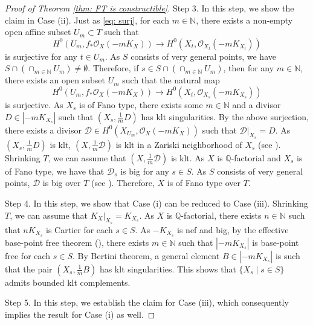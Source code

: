 \documentclass[11pt,oneside,reqno]{amsart}
\numberwithin{equation}{section}
\theoremstyle{definition}
\newcommand{\bN}{\mathbb{N}}
\newcommand{\bQ}{\mathbb{Q}}
\newcommand{\mD}{\mathcal{D}}
\newcommand{\mO}{\mathcal{O}}
\begin{document}
\begin{proof}[Proof of Theorem \ref{thm: FT is constructible}]
Step 3. In this step, we show the claim in Case (ii). Just as \eqref{eq: surj}, for each $m\in \bN$, there exists a non-empty open affine subset $U_m\subset T$ such that
\[
H^0(U_m, f_*\mO_X(-mK_X)) \to H^0(X_t, \mO_{X_t}(-mK_{X_t}))
\] is surjective for any $t\in U_m$. As $S$ consists of very general points, we have $S \cap (\cap_{m\in \bN} U_m) \neq \emptyset$. Therefore, if $s\in S \cap (\cap_{m\in \bN} U_m)$, then for any $m\in \bN$, there exists an open subset $U_m$ such that the natural map
\[
H^0(U_m, f_*\mO_X(-mK_X)) \to H^0(X_t, \mO_{X_s}(-mK_{X_s}))
\] is surjective. As $X_s$ is of Fano type, there exists some $m \in \bN$ and a divisor $D \in |-mK_{X_s}|$ such that $(X_s, \frac{1}{m} D)$ has klt singularities. By the above surjection, there exists a divisor $\mD \in H^0(X_{U_m}, \mO_X(-mK_X))$ such that $\mD|_{X_s}=D$. As $(X_s, \frac{1}{m} D)$ is klt, $(X, \frac 1 m \mD)$ is klt in a Zariski neighborhood of $X_s$ (see \cite[Theorem 9.5.19]{Laz04b}). Shrinking $T$, we can assume that $(X, \frac 1 m \mD)$ is klt. As $X$ is $\bQ$-factorial and $X_s$ is of Fano type, we have that $\mD_s$ is big for any $s\in S$. As $S$ consists of very general points, $\mD$ is big over $T$ (see \cite[Theorem 3.18]{Li22}). Therefore, $X$ is of Fano type over $T$.



Step 4. In this step, we show that Case (i) can be reduced to Case (iii). Shrinking $T$, we can assume that $K_X|_{X_s}=K_{X_s}$. As $X$ is $\bQ$-factorial, there exists $n\in \bN$ such that $nK_{X_s}$ is Cartier for each $s\in S$. As $-K_{X_s}$ is nef and big, by the effective base-point free theorem (\cite{Kol93}), there exists $m\in \bN$ such that $|-mK_{X_s}|$ is base-point free for each $s\in S$. By Bertini theorem, a general element $B \in |-mK_{X_s}|$ is such that the pair $(X_s, \frac{1}{m} B)$ has klt singularities. This shows that $\{X_s \mid s\in S\}$ admits bounded klt complements.

Step 5. In this step, we establish the claim for Case (iii), which consequently implies the result for Case (i) as well.


\end{proof}
\end{document}
